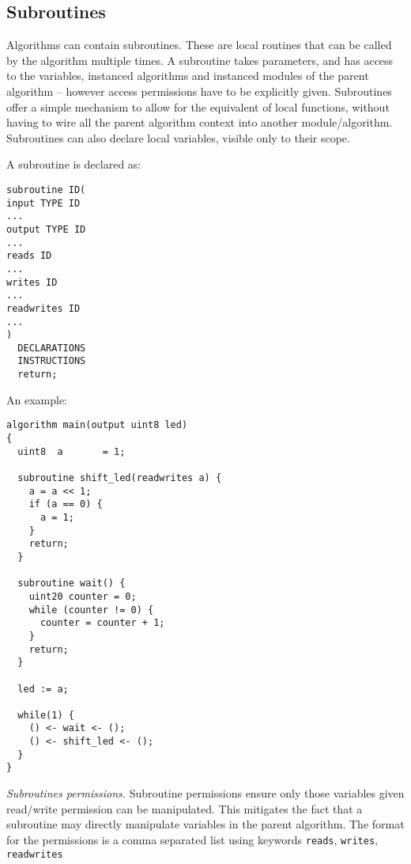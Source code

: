 \documentclass[a4]{article}
\begin{document}
\vspace*{5mm}
\noindent
{}


\subsection{Subroutines}

Algorithms can contain subroutines. These are local routines that can be called by the algorithm multiple times. A subroutine takes parameters, and has access to the variables, instanced algorithms and instanced modules of the parent algorithm -- however access permissions have to be explicitly given. 
%
Subroutines offer a simple mechanism to allow for the equivalent of local functions, without having to wire all the parent algorithm context into another module/algorithm. Subroutines can also declare local variables, visible only to their scope.

A subroutine is declared as:

\begin{verbatim}
subroutine ID(
input TYPE ID
...
output TYPE ID
...
reads ID
...
writes ID
...
readwrites ID
...
)
  DECLARATIONS
  INSTRUCTIONS
  return;
\end{verbatim}

An example:

\begin{verbatim}
algorithm main(output uint8 led)
{
  uint8  a       = 1;

  subroutine shift_led(readwrites a) {
    a = a << 1;
    if (a == 0) {
      a = 1;
    }
    return;
  }

  subroutine wait() {
    uint20 counter = 0;
    while (counter != 0) {
      counter = counter + 1;
    }
    return;
  }
    
  led := a;
  
  while(1) {
    () <- wait <- ();
    () <- shift_led <- ();
  }
}
\end{verbatim}

\noindent \textit{Subroutines permissions.} Subroutine permissions ensure only those variables given read/write
permission can be manipulated. This mitigates the fact that a subroutine may directly manipulate variables in the 
parent algorithm. The format for the permissions is a comma separated list using keywords \texttt{reads}, \texttt{writes}, \texttt{readwrites} \\
\end{document}
